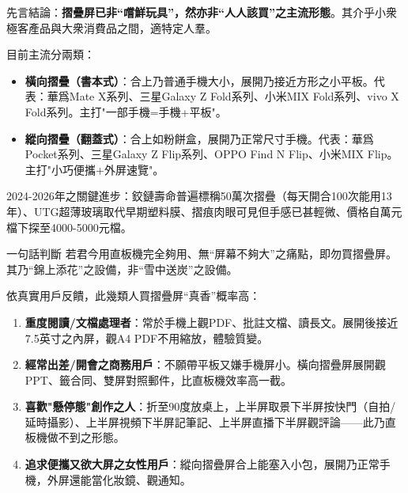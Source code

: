 


先言結論：\textbf{摺疊屏已非“嚐鮮玩具”，然亦非“人人該買”之主流形態}。其介乎小衆極客產品與大衆消費品之間，適特定人羣。

目前主流分兩類：

\begin{itemize}
  \item \textbf{橫向摺疊（書本式）}：合上乃普通手機大小，展開乃接近方形之小平板。代表：華爲Mate X系列、三星Galaxy Z Fold系列、小米MIX Fold系列、vivo X Fold系列。主打"一部手機=手機+平板"。
  \item \textbf{縱向摺疊（翻蓋式）}：合上如粉餅盒，展開乃正常尺寸手機。代表：華爲Pocket系列、三星Galaxy Z Flip系列、OPPO Find N Flip、小米MIX Flip。主打"小巧便攜+外屏速覽"。
\end{itemize}

2024-2026年之關鍵進步：鉸鏈壽命普遍標稱50萬次摺疊（每天開合100次能用13年）、UTG超薄玻璃取代早期塑料膜、摺痕肉眼可見但手感已甚輕微、價格自萬元檔下探至4000-5000元檔。

\begin{tcbinfo}{一句話判斷}
若君今用直板機完全夠用、無“屏幕不夠大”之痛點，即勿買摺疊屏。其乃“錦上添花”之設備，非“雪中送炭”之設備。

\end{tcbinfo}


依真實用戶反饋，此幾類人買摺疊屏“真香”概率高：

\begin{enumerate}
  \item \textbf{重度閱讀/文檔處理者}：常於手機上觀PDF、批註文檔、讀長文。展開後接近7.5英寸之內屏，觀A4 PDF不用縮放，體驗質變。
  \item \textbf{經常出差/開會之商務用戶}：不願帶平板又嫌手機屏小。橫向摺疊屏展開觀PPT、籤合同、雙屏對照郵件，比直板機效率高一截。
  \item \textbf{喜歡"懸停態"創作之人}：折至90度放桌上，上半屏取景下半屏按快門（自拍/延時攝影）、上半屏視頻下半屏記筆記、上半屏直播下半屏觀評論——此乃直板機做不到之形態。
  \item \textbf{追求便攜又欲大屏之女性用戶}：縱向摺疊屏合上能塞入小包，展開乃正常手機，外屏還能當化妝鏡、觀通知。
\end{enumerate}

